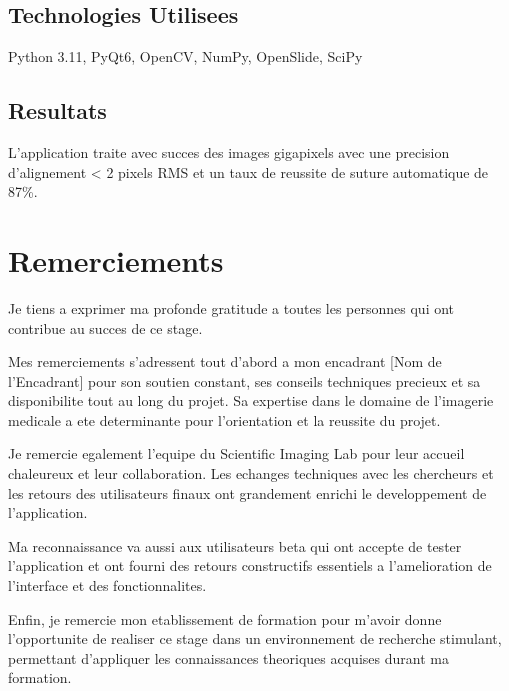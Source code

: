 \documentclass[12pt,a4paper]{article}
\begin{document}
\subsection*{Technologies Utilisees}
Python 3.11, PyQt6, OpenCV, NumPy, OpenSlide, SciPy

\subsection*{Resultats}
L'application traite avec succes des images gigapixels avec une precision d'alignement < 2 pixels RMS et un taux de reussite de suture automatique de 87\%.

\newpage

\tableofcontents

\newpage

\section*{Remerciements}

Je tiens a exprimer ma profonde gratitude a toutes les personnes qui ont contribue au succes de ce stage.

Mes remerciements s'adressent tout d'abord a mon encadrant [Nom de l'Encadrant] pour son soutien constant, ses conseils techniques precieux et sa disponibilite tout au long du projet. Sa expertise dans le domaine de l'imagerie medicale a ete determinante pour l'orientation et la reussite du projet.

Je remercie egalement l'equipe du Scientific Imaging Lab pour leur accueil chaleureux et leur collaboration. Les echanges techniques avec les chercheurs et les retours des utilisateurs finaux ont grandement enrichi le developpement de l'application.

Ma reconnaissance va aussi aux utilisateurs beta qui ont accepte de tester l'application et ont fourni des retours constructifs essentiels a l'amelioration de l'interface et des fonctionnalites.

Enfin, je remercie mon etablissement de formation pour m'avoir donne l'opportunite de realiser ce stage dans un environnement de recherche stimulant, permettant d'appliquer les connaissances theoriques acquises durant ma formation.
\end{document}
